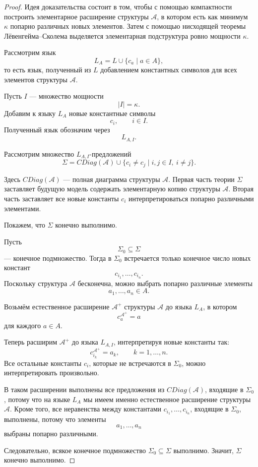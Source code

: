 \documentclass[12pt,a4paper,oneside,openany]{book}
\theoremstyle{definition}
\theoremstyle{plain}
\theoremstyle{remark}
\begin{document}
\begin{proof}
Идея доказательства состоит в том, чтобы с помощью компактности построить элементарное расширение структуры $\mathcal A$, в котором есть как минимум $\kappa$ попарно различных новых элементов. Затем с помощью нисходящей теоремы Лёвенгейма--Сколема выделяется элементарная подструктура ровно мощности $\kappa$.

Рассмотрим язык
\[
L_A=L\cup\{c_a\mid a\in A\},
\]
то есть язык, полученный из $L$ добавлением константных символов для всех элементов структуры $\mathcal A$.

Пусть $I$ — множество мощности
\[
|I|=\kappa.
\]
Добавим к языку $L_A$ новые константные символы
\[
c_i,\qquad i\in I.
\]
Полученный язык обозначим через
\[
L_{A,I}.
\]

Рассмотрим множество $L_{A,I}$-предложений
\[
\Sigma
=
CDiag(\mathcal A)
\cup
\{c_i\ne c_j\mid i,j\in I,\ i\ne j\}.
\]

Здесь $CDiag(\mathcal A)$ — полная диаграмма структуры $\mathcal A$. Первая часть теории $\Sigma$ заставляет будущую модель содержать элементарную копию структуры $\mathcal A$. Вторая часть заставляет все новые константы $c_i$ интерпретироваться попарно различными элементами.

Покажем, что $\Sigma$ конечно выполнимо.

Пусть
\[
\Sigma_0\subseteq\Sigma
\]
— конечное подмножество. Тогда в $\Sigma_0$ встречается только конечное число новых констант
\[
c_{i_1},\ldots,c_{i_n}.
\]
Поскольку структура $\mathcal A$ бесконечна, можно выбрать попарно различные элементы
\[
a_1,\ldots,a_n\in A.
\]

Возьмём естественное расширение $\mathcal A^+$ структуры $\mathcal A$ до языка $L_A$, в котором
\[
c_a^{\mathcal A^+}=a
\]
для каждого $a\in A$.

Теперь расширим $\mathcal A^+$ до языка $L_{A,I}$, интерпретируя новые константы так:
\[
c_{i_k}^{\mathcal A^+}=a_k,
\qquad
k=1,\ldots,n.
\]
Все остальные константы $c_i$, которые не встречаются в $\Sigma_0$, можно интерпретировать произвольно.

В таком расширении выполнены все предложения из $CDiag(\mathcal A)$, входящие в $\Sigma_0$, потому что на языке $L_A$ мы имеем именно естественное расширение структуры $\mathcal A$. Кроме того, все неравенства между константами $c_{i_1},\ldots,c_{i_n}$, входящие в $\Sigma_0$, выполнены, потому что элементы
\[
a_1,\ldots,a_n
\]
выбраны попарно различными.

Следовательно, всякое конечное подмножество $\Sigma_0\subseteq\Sigma$ выполнимо. Значит, $\Sigma$ конечно выполнимо.


\end{proof}
\end{document}
